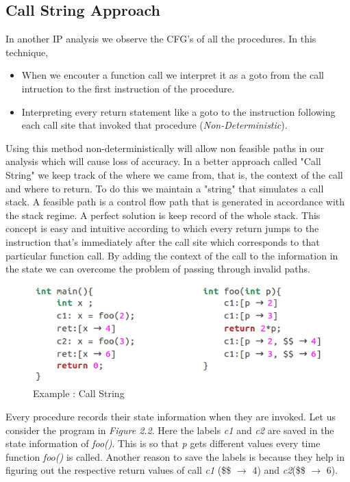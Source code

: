 \documentclass[12pt,oneside]{book}
\begin{document}
\subsection {Call String Approach}
In another IP analysis we observe the CFG's of all the procedures. In this technique,
\begin{itemize}
\item When we encouter a function call we interpret it as a goto from the call intruction to the first instruction of the procedure.
\item Interpreting every return statement like a goto to the instruction following each call site that invoked that procedure (\textit{Non-Deterministic}).
\end{itemize}
Using this method non-deterministically will allow non feasible paths in our analysis which will cause loss of accuracy. In a better approach called "Call String"\cite{callstring} we keep track of the where we came from, that is, the context of the call and where to return. To do this we maintain a "string" that simulates a call stack. A feasible path is a control flow path that is generated in accordance with the stack regime. A perfect solution is keep record of the whole stack. This concept is easy and intuitive according to which every return jumps to the instruction that's immediately after the call site which corresponds to that particular function call. By adding the context of the call to the information in the state we can overcome the problem of passing through invalid paths.\\

\begin{figure}[htbp]
\centering
\includegraphics[scale=0.6]{callString.png}
\caption{Example : Call String}
\end{figure}  
 
Every procedure records their state information when they are invoked. Let us consider the program in \textit{Figure 2.2}. Here the labels \textit{c1} and \textit{c2} are saved in the state information of \textit{foo()}. This is so that \textit{p} gets different values every time function \textit{foo()} is called. Another reason to save the labels is because they help in figuring out the respective return values of call \textit{c1} (\$\$ $\rightarrow$ 4) and \textit{c2}(\$\$ $\rightarrow$ 6).
\end{document}
